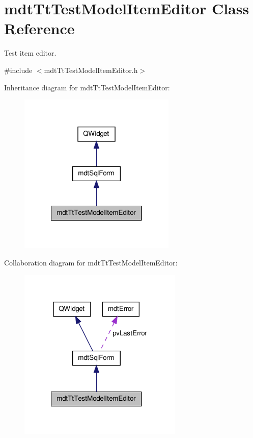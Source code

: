 \hypertarget{classmdt_tt_test_model_item_editor}{\section{mdt\-Tt\-Test\-Model\-Item\-Editor Class Reference}
\label{classmdt_tt_test_model_item_editor}
}


Test item editor.  




{\ttfamily \#include $<$mdt\-Tt\-Test\-Model\-Item\-Editor.\-h$>$}



Inheritance diagram for mdt\-Tt\-Test\-Model\-Item\-Editor\-:\nopagebreak
\begin{figure}[H]
\begin{center}
\leavevmode
\includegraphics[width=212pt]{classmdt_tt_test_model_item_editor__inherit__graph}
\end{center}
\end{figure}


Collaboration diagram for mdt\-Tt\-Test\-Model\-Item\-Editor\-:\nopagebreak
\begin{figure}[H]
\begin{center}
\leavevmode
\includegraphics[width=221pt]{classmdt_tt_test_model_item_editor__coll__graph}
\end{center}
\end{figure}
